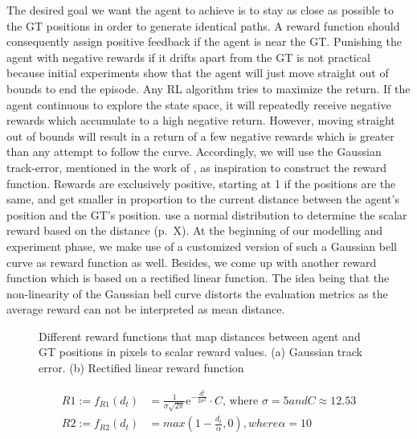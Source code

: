 The desired goal we want the agent to achieve is to stay as close as possible to the GT positions in order to generate identical paths. A reward function should consequently assign positive feedback if the agent is near the GT. Punishing the agent with negative rewards if it drifts apart from the GT is not practical because initial experiments show that the agent will just move straight out of bounds to end the episode. Any RL algorithm tries to maximize the return. If the agent continuous to explore the state space, it will repeatedly receive negative rewards which accumulate to a high negative return. However, moving straight out of bounds will result in a return of a few negative rewards which is greater than any attempt to follow the curve. Accordingly, we will use the Gaussian track-error, mentioned in the work of \cite{martinsen2018curved}, as inspiration to construct the reward function. Rewards are exclusively positive, starting at 1 if the positions are the same, and get smaller in proportion to the current distance between the agent's position and the GT's position. \cite{martinsen2018curved} use a normal distribution to determine the scalar reward based on the distance (p.~X). At the beginning of our modelling and experiment phase, we make use of a customized version of such a Gaussian bell curve as reward function as well. Besides, we come up with another reward function which is based on a rectified linear function. The idea being that the non-linearity of the Gaussian bell curve distorts the evaluation metrics as the average reward can not be interpreted as mean distance. 

\begin{figure}[H]
    \centering
    \begin{subfigure}[b]{0.495\textwidth}
        
        \label{fig:reward1}
    \end{subfigure}
    \begin{subfigure}[b]{0.495\textwidth}
        
        \label{fig:reward2}
    \end{subfigure}
    \caption{Different reward functions that map distances between agent and GT positions in pixels to scalar reward values. (a) Gaussian track error. (b) Rectified linear reward function}
    \label{fig:rewardFunctions}
\end{figure}

\begin{equation}
\begin{aligned}
    R1 := f_{R1}(d_t) &= \frac{1}{\sigma \sqrt{2\pi}} \mathrm{e}^{-\frac{d_t^2}{2\sigma^2}} \cdot C \text{, where $\sigma = 5 and C \approx 12.53$}
\\
R2 := f_{R2}(d_t) &= max(1 - \frac{d_t}{\alpha}, 0) , where \alpha = 10
    \end{aligned}
\end{equation}
